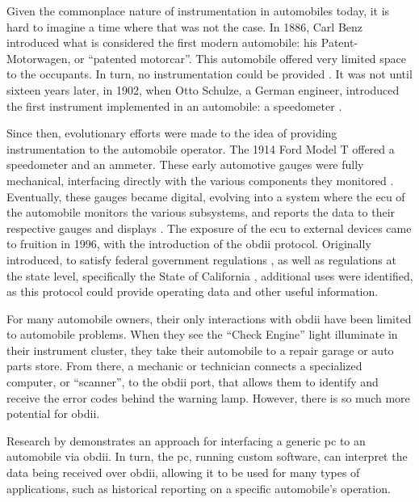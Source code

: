    \par Given the commonplace nature of instrumentation in automobiles today, it is hard to imagine a time where that was not the case. In 1886, Carl Benz introduced what is considered the first modern automobile: his Patent-Motorwagen, or ``patented motorcar''. This automobile offered very limited space to the occupants. In turn, no instrumentation could be provided \cite{Knoll2017}. It was not until sixteen years later, in 1902, when Otto Schulze, a German engineer, introduced the first instrument implemented in an automobile: a speedometer \cite{Knoll2017}.

    \par Since then, evolutionary efforts were made to the idea of providing instrumentation to the automobile operator. The 1914 Ford Model T offered a speedometer and an ammeter. These early automotive gauges were fully mechanical, interfacing directly with the various components they monitored \cite{Knoll2017}. Eventually, these gauges became digital, evolving into a system where the \gls{ecu} of the automobile monitors the various subsystems, and reports the data to their respective gauges and displays \cite{Knoll2017}. The exposure of the \gls{ecu} to external devices came to fruition in 1996, with the introduction of the \gls{obdii} protocol. Originally introduced, to satisfy  federal government regulations \cite{EPA1996}, as well as regulations at the state level, specifically the State of California \cite{CEPA2019}, additional uses were identified, as this protocol could provide operating data and other useful information.

    \par For many automobile owners, their only interactions with \gls{obdii} have been limited to automobile problems. When they see the ``Check Engine'' light illuminate in their instrument cluster, they take their automobile to a repair garage or auto parts store. From there, a mechanic or technician connects a specialized computer, or ``scanner'', to the \gls{obdii} port, that allows them to identify and receive the error codes behind the warning lamp. However, there is so much more potential for \gls{obdii}.

    \par Research by \cite{Godavarty2000} demonstrates an approach for interfacing a generic \gls{pc} to an automobile via \gls{obdii}. In turn, the \gls{pc}, running custom software, can interpret the data being received over \gls{obdii}, allowing it to be used for many types of applications, such as historical reporting on a specific automobile's operation.

